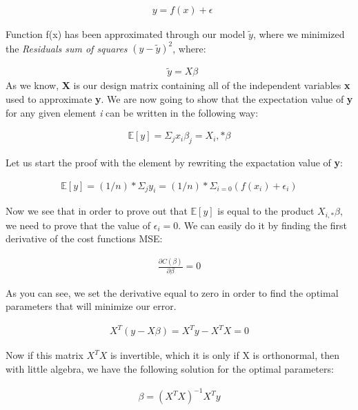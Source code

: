 \documentclass[a4paper, 10pt]{article}
\begin{document}
\begin{gather*}
	\textbf{ $y=f(x) + \epsilon$}
\end{gather*}

Function f(x) has been approximated through our model \textbf{$\tilde{y}$}, where we minimized the \emph{Residuals sum of squares} \textbf{$(y-\tilde{y})^2$}, where: 

\begin{gather*}
	\textbf{ $\tilde{y}=X\beta$}
\end{gather*}
As we know, \textbf{X} is our design matrix containing all of the independent variables \textbf{x} used to approximate \textbf{y}. We are now going to show that the expectation value of \textbf{y} for any given element \emph{i} can be written in the following way: 

\begin{gather*}
	\mathbb{E}[y] = \Sigma_{j} x_{i} \beta_{j} = X_i,* \beta 
\end{gather*}

Let us start the proof with the element by rewriting the expactation value of \textbf{y}:

\begin{gather*}
	\mathbb{E}[y] = (1/n)*\Sigma_{j} y_{i} = (1/n)*\Sigma_{i=0} (f(x_i) + \epsilon_i) 
\end{gather*}

Now we see that in order to prove out that $\mathbb{E}[y]$ is equal to the product $X_{i,*}\beta$, we need to prove that the value of $\epsilon_{i} = 0$. We can easily do it by finding the first derivative of the cost functions MSE: 

\begin{gather*}
	\frac{\partial C(\beta)}{\partial \beta} = 0
\end{gather*}

As you can see, we set the derivative equal to zero in order to find the optimal parameters that will minimize our error. 

\begin{gather*}
	X^T(y-X\beta) = X^Ty - X^TX = 0
\end{gather*}

Now if this matrix $X^TX$ is invertible, which it is only if X is orthonormal, then with little algebra, we have the following solution for the optimal parameters: 

\begin{gather*}
	\beta = (X^TX)^{-1}X^Ty
\end{gather*}
\end{document}
